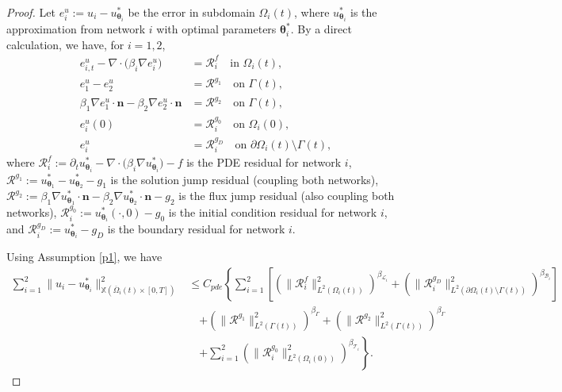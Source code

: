 \documentclass{article}
\newtheorem{proof}{Proof}[section]
\begin{document}
\begin{proof}
Let $e^u_i := u_i - u_{\boldsymbol{\theta}_i}^{*}$ be the error in subdomain $\Omega_i(t)$, where $u_{\boldsymbol{\theta}_i}^{*}$ is the approximation from network $i$ with optimal parameters $\boldsymbol{\theta}_i^*$. By a direct calculation, we have, for $i = 1, 2$,
\begin{equation}
\begin{aligned}
e^u_{i,t} - \nabla \cdot \bigl(\beta_i \nabla e^u_i\bigr) &= \mathcal{R}^f_i \quad \text{in } \Omega_i(t), \\
 e^u_1 - e^u_2&= \mathcal{R}^{g_1} \quad \text{on } \Gamma(t), \\
 \beta_1 \nabla e^u_1 \cdot \boldsymbol{n} - \beta_2 \nabla e^u_2 \cdot \boldsymbol{n}&= \mathcal{R}^{g_2} \quad \text{on } \Gamma(t), \\
e^u_i(0) &= \mathcal{R}^{g_0}_i \quad \text{on } \Omega_i(0), \\
e^u_i &= \mathcal{R}^{g_D}_i \quad \text{on } \partial \Omega_i(t) \setminus \Gamma(t),
\end{aligned}
\end{equation}
where $\mathcal{R}^f_i := \partial_t u_{\boldsymbol{\theta}_i}^{*} - \nabla \cdot \bigl(\beta_i \nabla u_{\boldsymbol{\theta}_i}^{*}\bigr) - f$ is the PDE residual for network $i$, $\mathcal{R}^{g_1} := u_{\boldsymbol{\theta}_1}^{*} - u_{\boldsymbol{\theta}_2}^{*} - g_1$ is the solution jump residual (coupling both networks), $\mathcal{R}^{g_2} := \beta_1 \nabla u_{\boldsymbol{\theta}_1}^{*} \cdot \boldsymbol{n} - \beta_2 \nabla u_{\boldsymbol{\theta}_2}^{*} \cdot \boldsymbol{n} - g_2$ is the flux jump residual (also coupling both networks), $\mathcal{R}^{g_0}_i := u_{\boldsymbol{\theta}_i}^{*}(\cdot,0) - g_0$ is the initial condition residual for network $i$, and $\mathcal{R}^{g_D}_i := u_{\boldsymbol{\theta}_i}^{*} - g_D$ is the boundary residual for network $i$.

Using Assumption \ref{p1}, we have
\begin{equation}
\begin{aligned}
\sum_{i=1}^{2} \|u_i - u_{\boldsymbol{\theta}_i}^{*}\|^2_{\mathbb{X}(\overline{\Omega}_i(t) \times [0,T])} &\leq C_{pde} \left\{ \sum_{i=1}^{2} \left[ \left(\|\mathcal{R}^f_i\|^2_{L^2(\Omega_i(t))}\right)^{\beta_{\mathcal{L}_i}} + \left(\|\mathcal{R}^{g_D}_i\|^2_{L^2(\partial\Omega_i(t) \setminus \Gamma(t))}\right)^{\beta_{\mathcal{B}_i}}\right] \right. \\
&\quad \left. + \left(\|\mathcal{R}^{g_1}\|^2_{L^2(\Gamma(t))}\right)^{\beta_{\Gamma}} + \left(\|\mathcal{R}^{g_2}\|^2_{L^2(\Gamma(t))}\right)^{\beta_{\Gamma}}\right. \\
&\quad \left.+\sum_{i=1}^{2} \left(\|\mathcal{R}^{g_0}_i\|^2_{L^2(\Omega_i(0))}\right)^{\beta_{\mathcal{T}_i}} \right\}.
\end{aligned}
\end{equation}


\end{proof}
\end{document}
